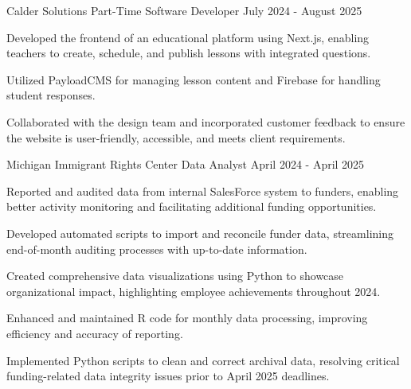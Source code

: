 \documentclass{../styles/cv}
\begin{document}
\subsectionpositiondate
    {Calder Solutions}
    {Part-Time Software Developer}
    {July 2024 - August 2025}
\resumesublistbegin
    \item Developed the frontend of an educational platform using Next.js, enabling teachers to create, schedule, and publish lessons with integrated questions.
    \item Utilized PayloadCMS for managing lesson content and Firebase for handling student responses.
    \item Collaborated with the design team and incorporated customer feedback to ensure the website is user-friendly, accessible, and meets client requirements.
\resumesublistend

\subsectionpositiondate
    {Michigan Immigrant Rights Center}
    {Data Analyst}
    {April 2024 - April 2025}
\resumesublistbegin
    \item Reported and audited data from internal SalesForce system to funders, enabling better activity monitoring and facilitating additional funding opportunities.
    \item Developed automated scripts to import and reconcile funder data, streamlining end-of-month auditing processes with up-to-date information.
    \item Created comprehensive data visualizations using Python to showcase organizational impact, highlighting employee achievements throughout 2024.
    \item Enhanced and maintained R code for monthly data processing, improving efficiency and accuracy of reporting.
    \item Implemented Python scripts to clean and correct archival data, resolving critical funding-related data integrity issues prior to April 2025 deadlines.
\resumesublistend
\end{document}
